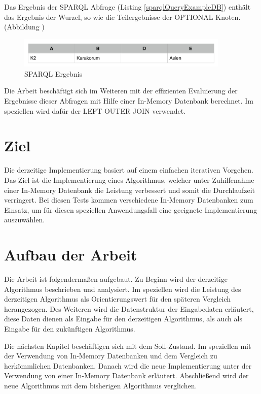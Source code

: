 \documentclass[draft,final]{vutinfth} %
\begin{document}
Das Ergebnis der SPARQL Abfrage (Listing \ref{sparqlQueryExampleDB}) enthält das Ergebnis der Wurzel, so wie die Teilergebnisse der OPTIONAL Knoten. (Abbildung )

\begin{figure}[ht]
	\centering
	\includegraphics[width=0.9\textwidth]{sparqlErgebnis}
	\caption{SPARQL Ergebnis}
	\label{sparqlErgebnis}
\end{figure}

Die Arbeit beschäftigt sich im Weiteren mit der effizienten Evaluierung der Ergebnisse dieser Abfragen mit Hilfe einer In-Memory Datenbank berechnet. Im speziellen wird dafür der LEFT OUTER JOIN verwendet.

\section*{Ziel}
Die derzeitige Implementierung basiert auf einem einfachen iterativen Vorgehen. Das Ziel ist die Implementierung eines Algorithmus, welcher unter Zuhilfenahme einer In-Memory Datenbank die Leistung verbessert und somit die Durchlaufzeit verringert. Bei diesen Tests kommen verschiedene In-Memory Datenbanken zum Einsatz, um für diesen speziellen Anwendungsfall eine geeignete Implementierung auszuwählen.

\section*{Aufbau der Arbeit}
Die Arbeit ist folgenderma{\ss}en aufgebaut. Zu Beginn wird der derzeitige Algorithmus beschrieben und analysiert. Im speziellen wird die Leistung des derzeitigen Algorithmus als Orientierungswert für den späteren Vergleich herangezogen. Des Weiteren wird die Datenstruktur der Eingabedaten erläutert, diese Daten dienen als Eingabe für den derzeitigen Algorithmus, als auch als Eingabe für den zukünftigen Algorithmus.

Die nächsten Kapitel beschäftigen sich mit dem Soll-Zustand. Im speziellen mit der Verwendung von In-Memory Datenbanken und dem Vergleich zu herkömmlichen Datenbanken.
Danach wird die neue Implementierung unter der Verwendung von einer In-Memory Datenbank erläutert. Abschlie{\ss}end wird der neue Algorithmus mit dem bisherigen Algorithmus verglichen.
\end{document}
